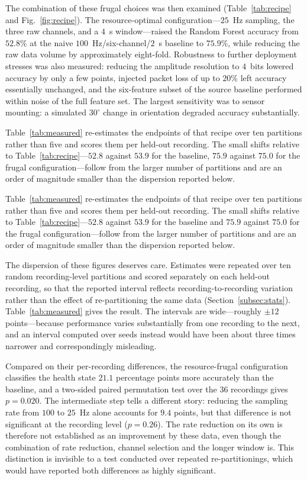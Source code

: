 The combination of these frugal choices was then examined
(Table~\ref{tab:recipe} and Fig.~\ref{fig:recipe}). The resource-optimal
configuration---$25$~Hz sampling, the three raw channels, and a $4$~s
window---raised the Random Forest accuracy from $52.8\%$ at the naive
$100$~Hz/six-channel/$2$~s baseline to $75.9\%$, while reducing the raw data
volume by approximately eight-fold. Robustness to further deployment stresses was
also measured: reducing the amplitude resolution to $4$~bits lowered accuracy by
only a few points, injected packet loss of up to $20\%$ left accuracy essentially
unchanged, and the six-feature subset of the source baseline performed within
noise of the full feature set. The largest sensitivity was to sensor mounting: a
simulated $30^{\circ}$ change in orientation degraded accuracy substantially.

Table~\ref{tab:measured} re-estimates the endpoints of that recipe over ten
partitions rather than five and scores them per held-out recording. The small
shifts relative to Table~\ref{tab:recipe}---$52.8$ against $53.9$ for the
baseline, $75.9$ against $75.0$ for the frugal configuration---follow from the
larger number of partitions and are an order of magnitude smaller than the
dispersion reported below.

Table~\ref{tab:measured} re-estimates the endpoints of that recipe over ten
partitions rather than five and scores them per held-out recording. The small
shifts relative to Table~\ref{tab:recipe}---$52.8$ against $53.9$ for the
baseline and $75.9$ against $75.0$ for the frugal configuration---follow from the
larger number of partitions and are an order of magnitude smaller than the
dispersion reported below.

The dispersion of these figures deserves care. Estimates were repeated over ten
random recording-level partitions and scored separately on each held-out
recording, so that the reported interval reflects recording-to-recording
variation rather than the effect of re-partitioning the same data
(Section~\ref{subsec:stats}). Table~\ref{tab:measured} gives the result. The
intervals are wide---roughly $\pm12$ points---because performance varies
substantially from one recording to the next, and an interval computed over seeds
instead would have been about three times narrower and correspondingly
misleading.

Compared on their per-recording differences, the resource-frugal configuration
classifies the health state $21.1$ percentage points more accurately than the
baseline, and a two-sided paired permutation test over the $36$ recordings gives
$p=0.020$. The intermediate step tells a different story: reducing the sampling
rate from $100$ to $25$~Hz alone accounts for $9.4$ points, but that difference is
not significant at the recording level ($p=0.26$). The rate reduction on its own
is therefore not established as an improvement by these data, even though the
combination of rate reduction, channel selection and the longer window is. This
distinction is invisible to a test conducted over repeated re-partitionings, which
would have reported both differences as highly significant.

